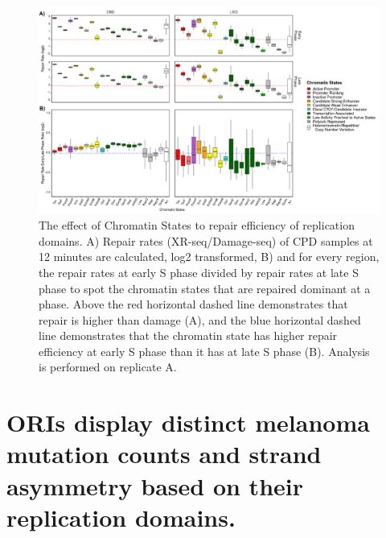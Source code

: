 \begin{figure}[H]
    \begin{center}
    \includegraphics[width=\textwidth]{Chapters/4_results/figures/fig3}
    \caption[The effect of Chromatin States to repair efficiency of replication domains.]{The effect of Chromatin States to repair efficiency of replication domains. A) Repair rates (XR-seq/Damage-seq) of CPD samples at 12 minutes are calculated, log2 transformed, B) and for every region, the repair rates at early S phase divided by repair rates at late S phase to spot the chromatin states that are repaired dominant at a phase. Above the red horizontal dashed line demonstrates that repair is higher than damage (A), and the blue horizontal dashed line demonstrates that the chromatin state has higher repair efficiency at early S phase than it has at late S phase (B). Analysis is performed on replicate A.}
    \label{fig:chromatin}
    \end{center}
    \end{figure}

\section{ORIs display distinct melanoma mutation counts and strand asymmetry based on their replication domains.}

